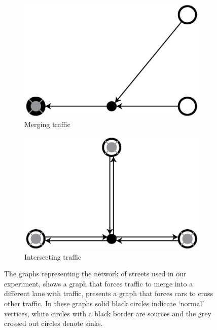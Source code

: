 \begin{figure}
	\centering
	\begin{subfigure}{0.45\textwidth}
		\centering
		\includegraphics[width=\textwidth]{./img/method_experiment_merging}
		\caption{Merging traffic}
		\label{fig:method:experiment:merging}
	\end{subfigure}
	\begin{subfigure}{0.45\textwidth}
		\centering
		\includegraphics[width=\textwidth]{./img/method_experiment_intersection}
		\caption{Intersecting traffic}
		\label{fig:method:experiment:intersection}
	\end{subfigure}	
	\caption{The graphs representing the network of streets used in our experiment,  shows a graph that forces traffic to merge into a different lane with traffic,  presents a graph that forces cars to cross other traffic. In these graphs solid black circles indicate `normal' vertices, white circles with a black border are sources and the grey crossed out circles denote sinks.}
	\label{fig:method:experimentGraphs}
\end{figure}

